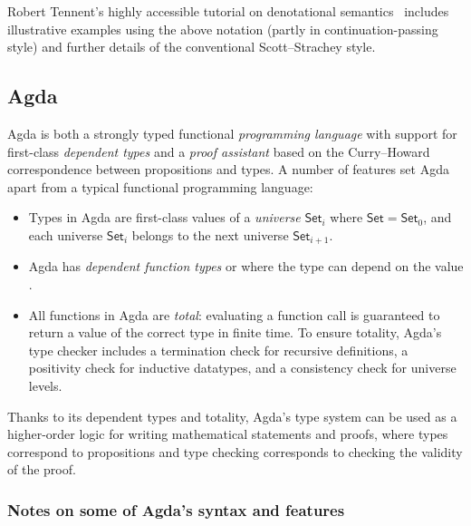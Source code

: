 Robert Tennent's highly accessible tutorial on denotational
semantics~\cite{Tennent1976DSP}
includes illustrative examples using the above notation (partly in
continuation-passing style) and further details of the conventional
Scott--Strachey style.

\subsection{Agda}\label{Background-agda}

Agda
\cite{Agda-Language,Agda-Wikipedia}
is both a strongly typed functional \emph{programming language} with
support for first-class \emph{dependent types} and a \emph{proof
assistant} based on the Curry--Howard correspondence between
propositions and types. A number of features set Agda apart from a
typical functional programming language:

\begin{itemize}
\item
  Types in Agda are first-class values of a \emph{universe}
  \(\textsf{Set}_i\) where \(\textsf{Set} = \textsf{Set}_0\), and each
  universe \(\textsf{Set}_i\) belongs to the next universe
  \(\textsf{Set}_{i+1}\).
\item
  Agda has \emph{dependent function types}  or
   where the type  can depend on the value
  .
\item
  All functions in Agda are \emph{total}: evaluating a function call is
  guaranteed to return a value of the correct type in finite time. To
  ensure totality, Agda's type checker includes a termination check for
  recursive definitions, a positivity check for inductive datatypes, and
  a consistency check for universe levels.
\end{itemize}

Thanks to its dependent types and totality, Agda's type system can be
used as a higher-order logic for writing mathematical statements and
proofs, where types correspond to propositions and type checking
corresponds to checking the validity of the proof.

\subsubsection*{Notes on some of Agda's syntax and
features}\label{Background-notes-on-some-of-agdas-syntax-and-features}

